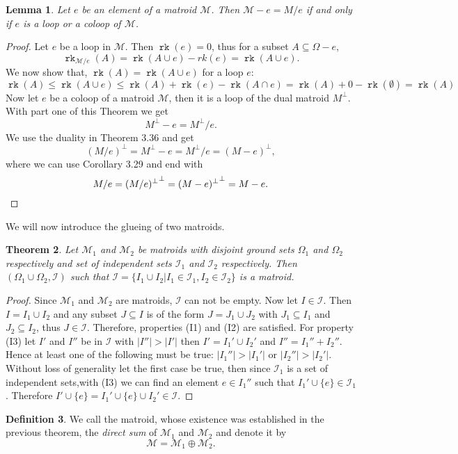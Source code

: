 \documentclass[12pt,a4paper, twoside, autooneside=false]{scrartcl}
\newtheorem{theorem}{Theorem}[section]
\newtheorem{lemma}[theorem]{Lemma}
\theoremstyle{definition}
\newtheorem{definition}[theorem]{Definition}
\theoremstyle{remark}
\numberwithin{equation}{section}
\DeclareMathOperator{\rk}{\mathtt{rk}}
\newcommand{\M}{\mathcal{M}} %
\begin{document}
\begin{lemma}
Let $e$ be an element of a matroid $\M$. Then $\M - e = M / e$ if and only if $e$ is a loop or a coloop of $\M$. 
\end{lemma}
\begin{proof}
Let $e$ be a loop in $\M$. Then $\rk(e) = 0$, thus for a subset $A \subseteq \Omega - e$, 
\[
\rk_{\M / e}(A) = \rk(A \cup e) - rk(e) = \rk(A \cup e).
\]
We now show that, $\rk(A) = \rk(A \cup e)$ for a loop $e$: 
\[
\rk(A) \leq \rk(A \cup e) \leq \rk(A) + \rk(e) - \rk(A \cap e) = \rk(A) + 0 - \rk(\emptyset) = \rk(A)
\]
Now let $e$ be a coloop of a matroid $\M$, then it is a loop of the dual matroid $M^\perp$. With part one of this Theorem we get 
\[
M^\perp - e = M^\perp / e.
\]
We use the duality in Theorem 3.36 and get 
\[
(M / e)^\perp = M^\perp - e = M^\perp / e = (M - e)^\perp,
\]
where we can use Corollary 3.29 and end with 
\[
M / e = {(M / e)^\perp}^\perp = {(M - e)^\perp}^\perp = M - e . \qedhere
\]
\end{proof}
We will now introduce the glueing of two matroids. 
\begin{theorem}
Let $\M_1$ and $\M_2$ be matroids with disjoint ground sets $\Omega_1$ and $\Omega_2$ respectively and set of independent sets $\mathcal{I}_1$ and $\mathcal{I}_2$ respectively. Then $(\Omega_1 \cup \Omega_2, \mathcal{I})$ such that $\mathcal{I} = \{ I_1 \cup I_2 | I_1 \in \mathcal{I}_1, I_2 \in \mathcal{I}_2\}$ is a matroid.
\end{theorem}
\begin{proof}
Since $\M_1$ and $\M_2$ are matroids, $\mathcal{I}$ can not be empty. Now let $I \in \mathcal{I}$. Then $I = I_1 \cup I_2$ and any subset $J \subseteq I$ is of the form $J = J_1 \cup J_2$ with $J_1 \subseteq I_1$ and $J_2 \subseteq I_2$, thus $J \in \mathcal{I}$. Therefore, properties (I1) and (I2) are satisfied. For property (I3) let $I'$ and $I''$ be in $\mathcal{I}$ with $|I''| > |I'|$ then $I' = I_1' \cup I_2'$ and $I'' = I_1'' + I_2''$. Hence at least one of the following must be true: $|I_1''| > |I_1'|$ or $|I_2''| > |I_2'|$. Without loss of generality let the first case be true, then since $\mathcal{I}_1$ is a set of independent sets,with (I3) we can find an element $e \in I_1''$ such that $I_1' \cup \{e\} \in \mathcal{I}_1$. Therefore $I' \cup \{e\} = I_1' \cup \{e\} \cup I_2' \in \mathcal{I}$.
\end{proof}
\begin{definition}
We call the matroid, whose existence was established in the previous theorem, the \textit{direct sum} of $\M_1$ and $\M_2$ and denote it by 
\[
\M = \M_1 \oplus \M_2.
\]
\end{definition}
\end{document}
